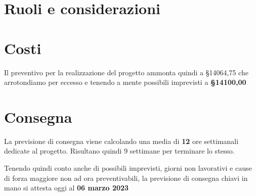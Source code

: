 \section{Ruoli e considerazioni}



\section{Costi}

Il preventivo per la realizzazione del progetto ammonta quindi a §14064,75 che arrotondiamo per eccesso e tenendo a mente possibili imprevisti a \textbf{§14100,00}

\section{Consegna}

La previsione di consegna viene calcolando una media di \textbf{12} ore settimanali dedicate al progetto. Risultano quindi 9 settimane per terminare lo stesso.

Tenendo quindi conto anche di possibili imprevisti, giorni non lavorativi e cause di forza maggiore non ad ora preventivabili, la previsione di consegna chiavi in mano si attesta oggi al \textbf{06 marzo 2023}
